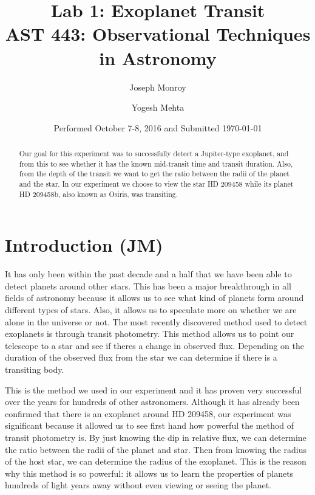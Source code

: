 \documentclass{aastex}
\begin{document}
\title{Lab 1: Exoplanet Transit \\ AST 443: Observational Techniques in Astronomy}

\date{Performed October 7-8, 2016 and Submitted \today}

\author{Joseph Monroy}

\author{Yogesh Mehta}


\begin{abstract}
Our goal for this experiment was to successfully detect a Jupiter-type exoplanet, and from this to see whether it has the known mid-transit time and transit duration. Also, from the depth of the transit we want to get the ratio between the radii of the planet and the star. In our experiment we choose to view the star HD 209458 while its planet HD 209458b, also known as Osiris, was transiting. 
\end{abstract}

\section{Introduction (JM)} \label{sec:intro}
It has only been within the past decade and a half that we have been able to detect planets around other stars. This has been a major breakthrough in all fields of astronomy because it allows us to see what kind of planets form around different types of stars. Also, it allows us to speculate more on whether we are alone in the universe or not. The most recently discovered method used to detect exoplanets is through transit photometry. This method allows us to point our telescope to a star and see if theres a change in observed flux. Depending on the duration of the observed flux from the star we can determine if there is a transiting body. 

This is the method we used in our experiment and it has proven very successful over the years for hundreds of other astronomers. Although it has already been confirmed that there is an exoplanet around HD 209458, our experiment was significant because it allowed us to see first hand how powerful the method of transit photometry is. By just knowing the dip in relative flux, we can determine the ratio between the radii of the planet and star. Then from knowing the radius of the host star, we can determine the radius of the exoplanet. This is the reason why this method is so powerful: it allows us to learn the properties of planets hundreds of light years away without even viewing or seeing the planet. 
\end{document}
